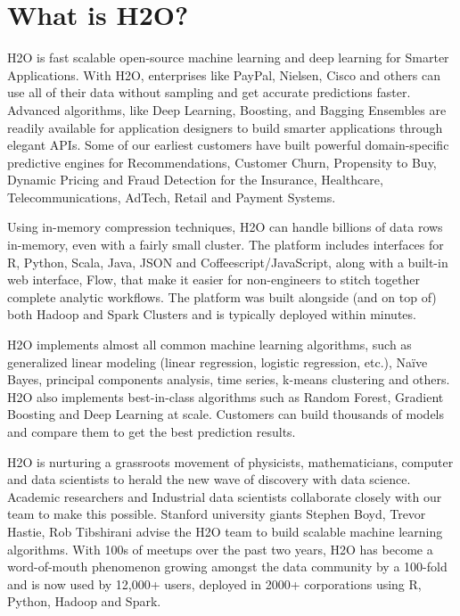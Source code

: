 \documentclass{article}[11pt]
\begin{document}
\section{What is H2O?}

H2O is fast scalable open-source machine learning and deep learning for Smarter Applications. With H2O, enterprises like PayPal, Nielsen, Cisco and others can use all of their data without sampling and get accurate predictions faster. Advanced algorithms, like Deep Learning, Boosting, and Bagging Ensembles are readily available for application designers to build smarter applications through elegant APIs. Some of our earliest customers have built powerful domain-specific predictive engines for Recommendations, Customer Churn, Propensity to Buy, Dynamic Pricing and Fraud Detection for the Insurance, Healthcare, Telecommunications, AdTech, Retail and Payment Systems.

Using in-memory compression techniques, H2O can handle billions of data rows in-memory, even with a fairly small cluster. The platform includes interfaces for R, Python, Scala, Java, JSON and Coffeescript/JavaScript, along with a built-in  web interface, Flow, that make it easier for non-engineers to stitch together complete analytic workflows. The platform was built alongside (and on top of) both Hadoop and Spark Clusters and is typically deployed within minutes.

H2O implements almost all common machine learning algorithms, such as generalized linear modeling (linear regression, logistic regression, etc.), Na\"{i}ve Bayes, principal components analysis, time series, k-means clustering and others. H2O also implements best-in-class algorithms such as Random Forest, Gradient Boosting and Deep Learning at scale. Customers can build thousands of models and compare them to get the best prediction results.

H2O is nurturing a grassroots movement of physicists, mathematicians, computer and data scientists to herald the new wave of discovery with data science. Academic researchers and Industrial data scientists collaborate closely with our team to make this possible. Stanford university giants Stephen Boyd, Trevor Hastie, Rob Tibshirani advise the H2O team to build scalable machine learning algorithms. With 100s of meetups over the past two years, H2O has become a word-of-mouth phenomenon growing amongst the data community by a 100-fold and is now used by 12,000+ users, deployed in 2000+ corporations using R, Python, Hadoop and Spark.
\end{document}
